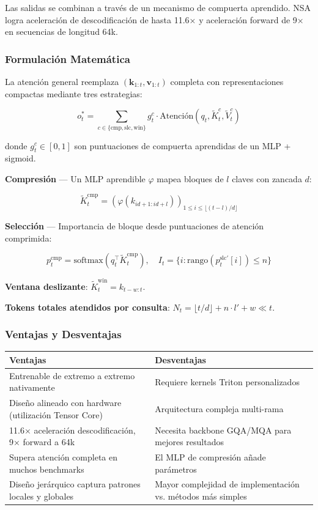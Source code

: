 \documentclass[11pt,a4paper]{article}
\begin{document}
Las salidas se combinan a través de un mecanismo de compuerta aprendido. NSA logra aceleración de descodificación de hasta 11.6× y aceleración forward de 9× en secuencias de longitud 64k.

\subsubsection{Formulación Matemática}

La atención general reemplaza $(\mathbf{k}_{1:t}, \mathbf{v}_{1:t})$ completa con representaciones compactas mediante tres estrategias:

$$
o_t^* = \sum_{c \in \{\text{cmp}, \text{slc}, \text{win}\}} g_t^c \cdot \text{Atención}(q_t, \tilde{K}_t^c, \tilde{V}_t^c)
$$

donde $g_t^c \in [0,1]$ son puntuaciones de compuerta aprendidas de un MLP + sigmoid.

\textbf{Compresión} — Un MLP aprendible $\varphi$ mapea bloques de $l$ claves con zancada $d$:

$$
\tilde{K}_t^{\text{cmp}} = \left(\varphi(k_{id+1:id+l})\right)_{1 \leq i \leq \lfloor(t-l)/d\rfloor}
$$

\textbf{Selección} — Importancia de bloque desde puntuaciones de atención comprimida:

$$
p_t^{\text{cmp}} = \text{softmax}(q_t^\top \tilde{K}_t^{\text{cmp}}), \quad I_t = \{i : \text{rango}(p_t^{\text{slc}'}[i]) \leq n\}
$$

\textbf{Ventana deslizante}: $\tilde{K}_t^{\text{win}} = k_{t-w:t}$.

\textbf{Tokens totales atendidos por consulta}: $N_t = \lfloor t/d \rfloor + n \cdot l' + w \ll t$.

\subsubsection{Ventajas y Desventajas}

\begin{tabular}{|p{4cm}|p{4cm}|}
\hline
\textbf{Ventajas} & \textbf{Desventajas} \\
\hline
Entrenable de extremo a extremo nativamente & Requiere kernels Triton personalizados \\
Diseño alineado con hardware (utilización Tensor Core) & Arquitectura compleja multi-rama \\
11.6× aceleración descodificación, 9× forward a 64k & Necesita backbone GQA/MQA para mejores resultados \\
Supera atención completa en muchos benchmarks & El MLP de compresión añade parámetros \\
Diseño jerárquico captura patrones locales y globales & Mayor complejidad de implementación vs. métodos más simples \\
\hline
\end{tabular}
\end{document}
